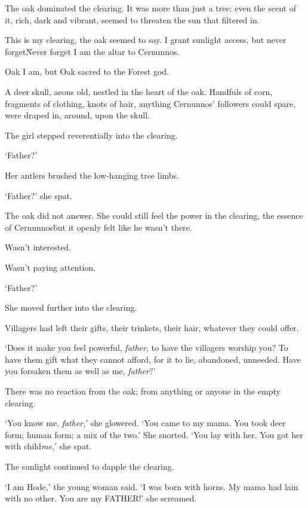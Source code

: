 

\prelude

The oak dominated the clearing. It was more than just a tree: even the
scent of it, rich, dark and vibrant, seemed to threaten the sun that
filtered in.

This is my clearing, the oak seemed to say. I grant sunlight access,
but never forget\=

Never forget I am the altar to Cernunnos.

Oak I am, but Oak sacred to the Forest god.

A deer skull, aeons old, nestled in the heart of the oak. Handfuls of
corn, fragments of clothing, knots of hair, anything Cernunnos’
followers could spare, were draped in, around, upon the skull.

The girl stepped reverentially into the clearing.

‘Father?’

\fugue

Her antlers brushed the low-hanging tree limbs.

‘Father?’ she spat.

The oak did not answer. She could still feel the power in the
clearing, the essence of Cernunnos\=but it openly felt like he wasn’t
there.

Wasn’t interested.

Wasn’t paying attention.

‘Father?’

She moved further into the clearing.

Villagers had left their gifts, their trinkets, their hair, whatever
they could offer.

‘Does it make you feel powerful, \textit{father}, to have the
villagers worship you? To have them gift what they cannot afford, for
it to lie, abandoned, unneeded. Have you forsaken them as well as me,
\textit{father}?’

There was no reaction from the oak; from anything or anyone in the
empty clearing.

‘You know me, \textit{father},’ she glowered. ‘You came to my
mama. You took deer form; human form; a mix of the two.’ She
snorted. ‘You lay with her. You got her with child\=\textit{me},’ she
spat.

The sunlight continued to dapple the clearing.

‘I am Hode,’ the young woman said. ‘I was born with horns. My mama had
lain with no other. You are my FATHER!’ she screamed.

